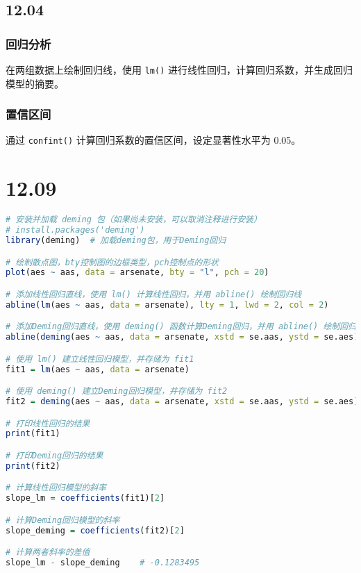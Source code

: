 \documentclass[UTF8]{report}
\theoremstyle{MyLineTheoremStyle} %
\theoremstyle{MyBlockTheoremStyle} %
\theoremstyle{MySubsubsectionStyle} %
\begin{document}
    \section*{12.04}

    \subsection*{回归分析}
    
    在两组数据上绘制回归线，使用 \texttt{lm()} 进行线性回归，计算回归系数，并生成回归模型的摘要。
    
    \subsection*{置信区间}
    
    通过 \texttt{confint()} 计算回归系数的置信区间，设定显著性水平为 0.05。



\chapter{12.09}

\begin{lstlisting}[language=R]
    # 安装并加载 deming 包（如果尚未安装，可以取消注释进行安装）
# install.packages('deming')  
library(deming)  # 加载deming包，用于Deming回归

# 绘制散点图，bty控制图的边框类型，pch控制点的形状
plot(aes ~ aas, data = arsenate, bty = "l", pch = 20)  

# 添加线性回归直线，使用 lm() 计算线性回归，并用 abline() 绘制回归线
abline(lm(aes ~ aas, data = arsenate), lty = 1, lwd = 2, col = 2)  

# 添加Deming回归直线，使用 deming() 函数计算Deming回归，并用 abline() 绘制回归线
abline(deming(aes ~ aas, data = arsenate, xstd = se.aas, ystd = se.aes), lty = 1, lwd = 2, col = 4)  

# 使用 lm() 建立线性回归模型，并存储为 fit1
fit1 = lm(aes ~ aas, data = arsenate)  

# 使用 deming() 建立Deming回归模型，并存储为 fit2
fit2 = deming(aes ~ aas, data = arsenate, xstd = se.aas, ystd = se.aes)  

# 打印线性回归的结果
print(fit1)  

# 打印Deming回归的结果
print(fit2)  

# 计算线性回归模型的斜率
slope_lm = coefficients(fit1)[2]  

# 计算Deming回归模型的斜率
slope_deming = coefficients(fit2)[2]  

# 计算两者斜率的差值
slope_lm - slope_deming    # -0.1283495  

\end{lstlisting}
\end{document}
